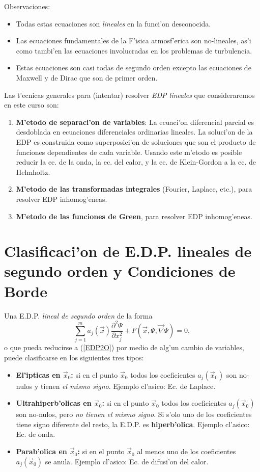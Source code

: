 Observaciones:

\begin{itemize}
\item Todas estas ecuaciones son \textit{lineales} en la funci'on desconocida.
\item Las ecuaciones fundamentales de la F'isica atmosf'erica son no-lineales, as'i como tambi'en las ecuaciones involucradas en los problemas de turbulencia.
\item Estas ecuaciones son casi todas de segundo orden excepto las ecuaciones de Maxwell y de Dirac que son de primer orden.
\end{itemize}

Las t'ecnicas generales para (intentar) resolver \textit{EDP lineales} que consideraremos en este curso son:
\begin{enumerate}
\item \textbf{M'etodo de separaci'on de variables}: La ecuaci'on diferencial parcial es desdoblada en ecuaciones diferenciales ordinarias lineales. La soluci'on de la EDP es construida como superposici'on de soluciones que son el producto de funciones dependientes de cada variable. Usando este m'etodo es posible reducir la ec. de la onda, la ec. del calor, y la ec. de Klein-Gordon a la ec. de Helmholtz.
\item \textbf{M'etodo de las transformadas integrales} (Fourier, Laplace, etc.), para resolver EDP inhomog'eneas.
\item \textbf{M'etodo de las funciones de Green}, para resolver EDP inhomog'eneas.

\end{enumerate}

\section{Clasificaci'on de E.D.P. lineales de segundo orden y Condiciones de Borde}

Una E.D.P. \textit{lineal de segundo orden} de la forma \cite{Hassani}
\begin{equation}\label{EDP2O}
\sum_{j=1}^m a_j(\vec{x})\frac{\partial^2\Psi}{\partial x_j^2}+F\left(\vec{x},\Psi,\vec\nabla\Psi\right)=0,
\end{equation}
o que pueda reducirse a (\ref{EDP2O}) por medio de alg'un cambio de variables, puede clasificarse en los siguientes tres tipos:
\begin{itemize}
\item \textbf{El'ipticas en $\vec{x}_0$:} si en el punto $\vec{x}_0$ todos los coeficientes $a_j(\vec{x}_0)$ son no-nulos y tienen \textit{el mismo signo}. Ejemplo cl'asico: Ec. de Laplace.
\item \textbf{Ultrahiperb'olicas en $\vec{x}_0$:} si en el punto $\vec{x}_0$ todos los coeficientes $a_j(\vec{x}_0)$ son no-nulos, pero \textit{no tienen el mismo signo}. Si s'olo uno de los coeficientes tiene signo diferente del resto, la E.D.P. es \textbf{hiperb'olica}. Ejemplo cl'asico: Ec. de onda.
\item \textbf{Parab'olica en $\vec{x}_0$:} si en el punto $\vec{x}_0$ al menos uno de los coeficientes $a_j(\vec{x}_0)$ se anula. Ejemplo cl'asico: Ec. de difusi'on del calor.
\end{itemize}

